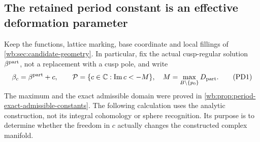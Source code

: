 \subsection{The retained period constant is an effective deformation parameter}
\label{wb:sec:retained-period-deformation}

Keep the functions, lattice marking, base coordinate and local fillings of
\cref{wb:sec:candidate-geometry}. In particular, fix the actual cusp-regular
solution $\beta^{\rm part}$, not a replacement with a cusp pole, and write
\[
 \beta_c=\beta^{\rm part}+c,\qquad
 \mathcal P=\{c\in\mathbb C:\operatorname{Im}c<-M\},
 \quad M=\max_{B\setminus\{p_0\}}D_{\rm part}.
 \tag{PD1}
\]
The maximum and the exact admissible domain were proved in
\cref{wb:prop:period-exact-admissible-constants}. The following calculation
uses the analytic construction, not its integral cohomology or sphere
recognition. Its purpose is to determine whether the freedom in $c$
actually changes the constructed complex manifold.


